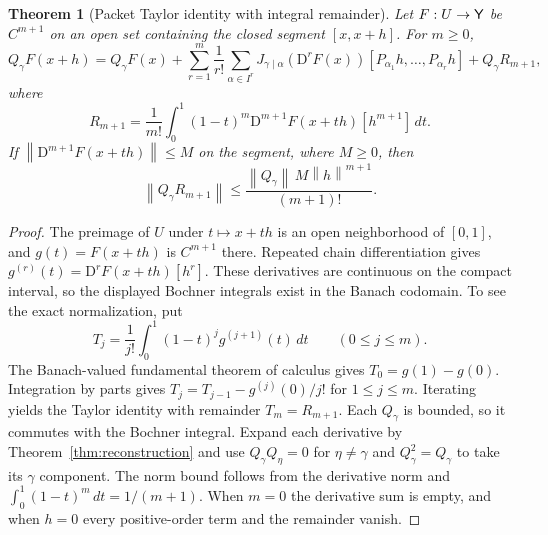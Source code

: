 \documentclass[11pt]{article}
\newtheorem{theorem}{Theorem}[section]
\theoremstyle{remark}\newtheorem{remark}[theorem]{Remark}
\newcommand{\norm}[1]{\left\lVert#1\right\rVert}
\newcommand{\D}{\mathrm D}
\begin{document}
\begin{theorem}[Packet Taylor identity with integral remainder]\label{thm:taylor}
Let $F:U\to\mathsf Y$ be $C^{m+1}$ on an open set containing the closed segment $[x,x+h]$. For $m\ge0$,
\[
Q_\gamma F(x+h)=Q_\gamma F(x)
+\sum_{r=1}^{m}\frac{1}{r!}\sum_{\alpha\in I^r}
J_{\gamma\mid\alpha}(\D^rF(x))
[P_{\alpha_1}h,\ldots,P_{\alpha_r}h]
+Q_\gamma R_{m+1},
\]
where
\[
R_{m+1}=\frac1{m!}\int_0^1(1-t)^m\D^{m+1}F(x+th)[h^{m+1}]\,dt.
\]
If $\norm{\D^{m+1}F(x+th)}\le M$ on the segment, where $M\ge0$, then
\[
\norm{Q_\gamma R_{m+1}}\le\frac{\norm{Q_\gamma}\,M\norm{h}^{m+1}}{(m+1)!}.
\]
\end{theorem}
\begin{proof}
The preimage of $U$ under $t\mapsto x+th$ is an open neighborhood of $[0,1]$, and $g(t)=F(x+th)$ is $C^{m+1}$ there. Repeated chain differentiation gives $g^{(r)}(t)=\D^rF(x+th)[h^r]$. These derivatives are continuous on the compact interval, so the displayed Bochner integrals exist in the Banach codomain. To see the exact normalization, put
\[
T_j=\frac1{j!}\int_0^1(1-t)^j g^{(j+1)}(t)\,dt
\qquad(0\le j\le m).
\]
The Banach-valued fundamental theorem of calculus gives $T_0=g(1)-g(0)$. Integration by parts gives
$T_j=T_{j-1}-g^{(j)}(0)/j!$ for $1\le j\le m$. Iterating yields the Taylor identity with remainder $T_m=R_{m+1}$. Each $Q_\gamma$ is bounded, so it commutes with the Bochner integral. Expand each derivative by Theorem~\ref{thm:reconstruction} and use $Q_\gamma Q_\eta=0$ for $\eta\ne\gamma$ and $Q_\gamma^2=Q_\gamma$ to take its $\gamma$ component. The norm bound follows from the derivative norm and $\int_0^1(1-t)^m\,dt=1/(m+1)$. When $m=0$ the derivative sum is empty, and when $h=0$ every positive-order term and the remainder vanish.
\end{proof}
\end{document}
